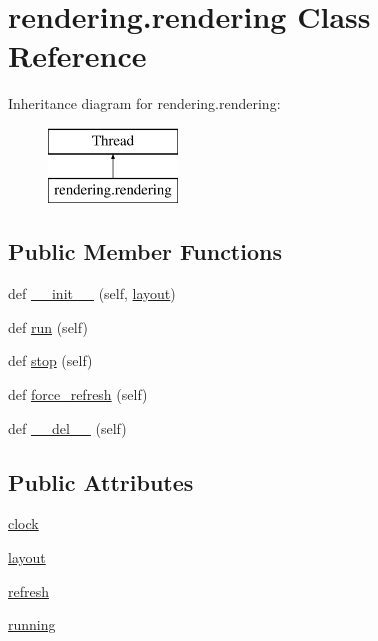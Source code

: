 \hypertarget{classrendering_1_1rendering}{}\section{rendering.\+rendering Class Reference}
\label{classrendering_1_1rendering}
Inheritance diagram for rendering.\+rendering\+:\begin{figure}[H]
\begin{center}
\leavevmode
\includegraphics[height=2.000000cm]{classrendering_1_1rendering}
\end{center}
\end{figure}
\subsection*{Public Member Functions}
\begin{DoxyCompactItemize}
\item 
def \hyperlink{classrendering_1_1rendering_ac5379553b476c1582ac0d46421f215cb}{\+\_\+\+\_\+init\+\_\+\+\_\+} (self, \hyperlink{classrendering_1_1rendering_ae24d971b9a3addeac990b60abe4be00c}{layout})
\item 
def \hyperlink{classrendering_1_1rendering_a3116ee6b43720cc46180929920e837fc}{run} (self)
\item 
def \hyperlink{classrendering_1_1rendering_a7a5eff668345f94690e0737624416432}{stop} (self)
\item 
def \hyperlink{classrendering_1_1rendering_a2a20df6fdb79fdb9bbd16319ba02b631}{force\+\_\+refresh} (self)
\item 
def \hyperlink{classrendering_1_1rendering_a7a953f9a342455faaed5789eeca27419}{\+\_\+\+\_\+del\+\_\+\+\_\+} (self)
\end{DoxyCompactItemize}
\subsection*{Public Attributes}
\begin{DoxyCompactItemize}
\item 
\hyperlink{classrendering_1_1rendering_a209763b3162b34173314ab6ef43891cc}{clock}
\item 
\hyperlink{classrendering_1_1rendering_ae24d971b9a3addeac990b60abe4be00c}{layout}
\item 
\hyperlink{classrendering_1_1rendering_a7060a1797d07abb18e5eec51faeef313}{refresh}
\item 
\hyperlink{classrendering_1_1rendering_accfbd0ead30cf813505a94daf4a193df}{running}
\end{DoxyCompactItemize}


